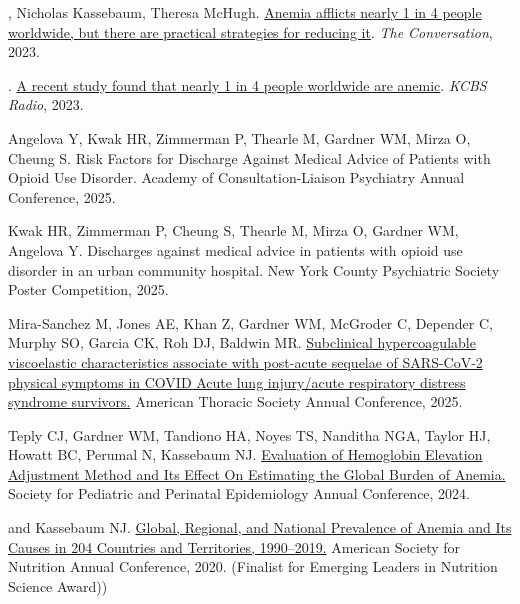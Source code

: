 \documentclass[11pt,article,oneside]{memoir}
\begin{document}
, Nicholas Kassebaum, Theresa McHugh. \href{https://theconversation.com/anemia-afflicts-nearly-1-in-4-people-worldwide-but-there-are-practical-strategies-for-reducing-it-212177}{ 
Anemia afflicts nearly 1 in 4 people worldwide, but there are practical strategies for reducing it}. \emph{The Conversation}, 2023.

. \href{https://omny.fm/shows/kcbsam-on-demand/a-recent-study-found-that-nearly-1-in-four-people}{
	A recent study found that nearly 1 in 4 people worldwide are anemic}. \emph{KCBS Radio}, 2023.

\bigskip

\medskip

\ind Angelova Y, Kwak HR, Zimmerman P, Thearle M, {\minbold Gardner WM}, Mirza O, Cheung S. Risk Factors for Discharge Against Medical Advice of Patients with Opioid Use Disorder. 
Academy of Consultation-Liaison Psychiatry Annual Conference, 2025.

\ind Kwak HR, Zimmerman P, Cheung S, Thearle M, Mirza O, {\minbold Gardner WM}, Angelova Y. Discharges against medical advice in patients with opioid use disorder in an urban community hospital. 
New York County Psychiatric Society Poster Competition, 2025.

\ind Mira-Sanchez M, Jones AE, Khan Z, {\minbold Gardner WM}, McGroder C, Depender C, Murphy SO, Garcia CK, Roh DJ, Baldwin MR. \href{https://www.atsjournals.org/doi/abs/10.1164/ajrccm.2025.211.Abstracts.A3694}{Subclinical 
hypercoagulable viscoelastic characteristics associate with post-acute sequelae of SARS-CoV-2 physical symptoms in COVID Acute lung injury/acute respiratory distress syndrome survivors.} American Thoracic Society Annual Conference, 2025. 

\ind Teply CJ, {\minbold Gardner WM}, Tandiono HA, Noyes TS, Nanditha NGA, Taylor HJ, Howatt BC, Perumal N, Kassebaum NJ. \href{https://sper.org/wp-content/uploads/2024/06/2024-Abstract-Book-FINAL.pdf}{Evaluation of Hemoglobin Elevation Adjustment Method and 
Its Effect On Estimating the Global Burden of Anemia.} Society for Pediatric and Perinatal Epidemiology Annual Conference, 2024. 

 and Kassebaum NJ. \href{https://doi.org/10.1093/cdn/nzaa053_035}{Global, Regional, and National Prevalence of Anemia and Its
Causes in 204 Countries and Territories, 1990--2019.} American Society for Nutrition Annual Conference, 2020. (Finalist for Emerging 
Leaders in Nutrition Science Award))
\end{document}
